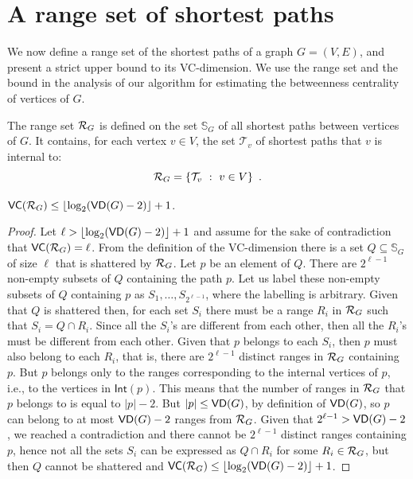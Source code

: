\section{A range set of shortest paths}\label{sec:rangeset}
We now define a range set of the shortest paths of a graph $G=(V,E)$, and present 
a strict upper bound to its VC-dimension. %
We use the range set and the bound in the analysis of our algorithm for estimating
the betweenness centrality of vertices of $G$.

The range set $\mathcal{R}_G$ is defined on the set $\mathbb{S}_G$ of all shortest
paths between vertices of $G$. It contains, for each vertex $v\in V$, the set
$\mathcal{T}_v$ of shortest paths that $v$ is internal to:
\[
\mathcal{R}_G = \{\mathcal{T}_v ~:~ v\in V\}\enspace.
\]

\begin{lemma}\label{lem:vcdimuppbound}
  $\mathsf{VC}(\mathcal{R}_G)\le\lfloor\log_2(\mathsf{VD}(G)-2)\rfloor+1$.
\end{lemma}

\begin{proof}
Let $\ell>\lfloor\log_2(\mathsf{VD}(G)-2)\rfloor+1$ and assume for the sake of contradiction
that $\mathsf{VC}(\mathcal{R}_G)=\ell$. From the definition of the VC-dimension there is a set
$Q\subseteq\mathbb{S}_G$ of size $\ell$ that is shattered by $\mathcal{R}_G$. Let $p$ be
an element of $Q$. There are  $2^{\ell-1}$ non-empty subsets of
$Q$ containing the path $p$. Let us label these non-empty subsets of $Q$ containing $p$ as
$S_1,\dotsc,S_{2^{\ell-1}}$, where the labelling is arbitrary.
Given that $Q$ is shattered then, for each set $S_i$ there must be a range $R_i$ in
$\mathcal{R}_G$ such that $S_i=Q\cap R_i$. Since all the $S_i$'s are
different from each other, then all the $R_i$'s must be different from each
other. Given that $p$ belongs to each $S_i$, then $p$ must also belong to each
$R_i$, that is, there are $2^{\ell-1}$ distinct ranges in $\mathcal{R}_G$ containing
$p$. But $p$ belongs only to the ranges corresponding to the internal vertices of
$p$, i.e., to the vertices in $\mathsf{Int}(p)$. This means that the number of ranges
in $\mathcal{R}_G$ that $p$ belongs to is equal to $|p|-2$. But $|p|\le\mathsf{VD}(G)$, by
definition of $\mathsf{VD}(G)$, so $p$
can belong to at most $\mathsf{VD}(G)-2$ ranges from $\mathcal{R}_G$. Given that
$2^{\ell-1}>\mathsf{VD}(G)-2$, we reached a contradiction and there cannot be $2^{\ell-1}$
distinct ranges containing $p$, hence not all the sets $S_i$ can be expressed as
$Q\cap R_i$ for some $R_i\in\mathcal{R}_G$, but then $Q$ cannot be shattered and
$\mathsf{VC}(\mathcal{R}_G)\le\lfloor\log_2(\mathsf{VD}(G)-2)\rfloor+1$.%
\end{proof}


